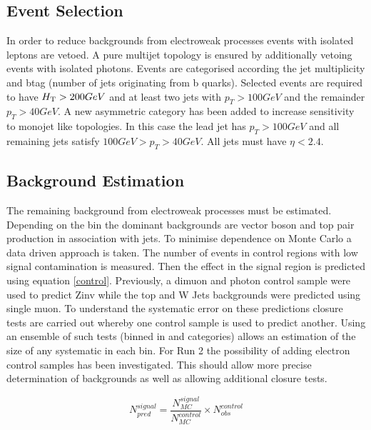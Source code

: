 \subsection{Event Selection}
In order to reduce backgrounds from electroweak processes events with isolated leptons are vetoed. A pure multijet topology is ensured by additionally vetoing events with isolated photons. Events are categorised according the jet multiplicity and btag (number of jets originating from b quarks). Selected events are required to have $\mbox{$H_\text{T}$} > 200 GeV$ and at least two jets with $p_T > 100GeV$ and the remainder $p_T > 40GeV$. A new asymmetric category has been added to increase sensitivity to monojet like topologies. In this case the lead jet has $p_T > 100 GeV$ and all remaining jets satisfy $100 GeV > p_T > 40GeV$. All jets must have $\eta < 2.4$.

\subsection{Background Estimation}
\label{sec:bkgd-est}
The remaining background from electroweak processes must be estimated. Depending on the bin the dominant backgrounds are vector boson and top pair production in association with jets. To minimise dependence on Monte Carlo a data driven approach is taken. The number of events in control regions with low signal contamination is measured. Then the effect in the signal region is predicted using equation \ref{control}. Previously, a dimuon and photon control sample were used to predict Zinv while the top and W Jets backgrounds were predicted using single muon. To understand the systematic error on these predictions closure tests are carried out whereby one control sample is used to predict another. Using an ensemble of such tests (binned in \scalht and categories) allows an estimation of the size of any systematic in each bin. For Run 2 the possibility of adding electron control samples has been investigated. This should allow more precise determination of backgrounds as well as allowing additional closure tests.

\begin{equation}
\label{control}
N_{pred}^{signal}=\frac{N_{MC}^{signal}}{N_{MC}^{control}}\times N^{control}_{obs}
\end{equation} 

